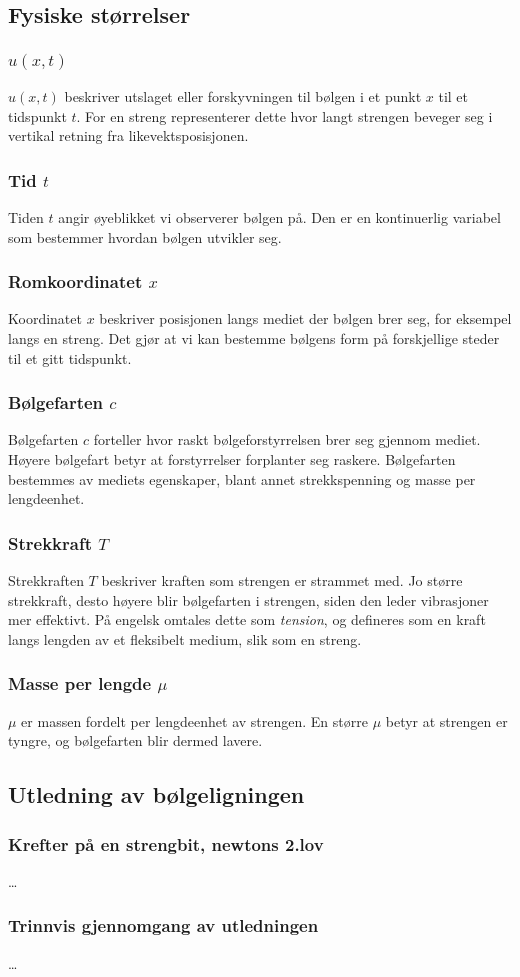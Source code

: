 \subsection{Fysiske størrelser}

\subsubsection{\texorpdfstring{$u(x,t)$}{u(x,t)}}
$u(x,t)$ beskriver utslaget eller forskyvningen til bølgen i et punkt $x$ til et tidspunkt $t$. 
For en streng representerer dette hvor langt strengen beveger seg i vertikal retning fra likevektsposisjonen.

\subsubsection{Tid \texorpdfstring{$t$}{t}}
Tiden $t$ angir øyeblikket vi observerer bølgen på. 
Den er en kontinuerlig variabel som bestemmer hvordan bølgen utvikler seg.

\subsubsection{Romkoordinatet \texorpdfstring{$x$}{x}}
Koordinatet $x$ beskriver posisjonen langs mediet der bølgen brer seg, for eksempel langs en streng. 
Det gjør at vi kan bestemme bølgens form på forskjellige steder til et gitt tidspunkt.

\subsubsection{Bølgefarten \texorpdfstring{$c$}{c}}
Bølgefarten $c$ forteller hvor raskt bølgeforstyrrelsen brer seg gjennom mediet. 
Høyere bølgefart betyr at forstyrrelser forplanter seg raskere. 
Bølgefarten bestemmes av mediets egenskaper, blant annet strekkspenning og masse per lengdeenhet.

\subsubsection{Strekkraft \texorpdfstring{$T$}{T}}
Strekkraften $T$ beskriver kraften som strengen er strammet med. 
Jo større strekkraft, desto høyere blir bølgefarten i strengen, siden den leder vibrasjoner mer effektivt.
På engelsk omtales dette som \emph{tension}, og defineres som en kraft langs lengden av et fleksibelt medium, 
slik som en streng. \parencite{libretextsTension}

\subsubsection{Masse per lengde \texorpdfstring{$\mu$}{mu}}
$\mu$ er massen fordelt per lengdeenhet av strengen. 
En større $\mu$ betyr at strengen er tyngre, og bølgefarten blir dermed lavere.

\subsection{Utledning av bølgeligningen}
\subsubsection{Krefter på en strengbit, newtons 2.lov}
\dots

\subsubsection{Trinnvis gjennomgang av utledningen}
\dots
